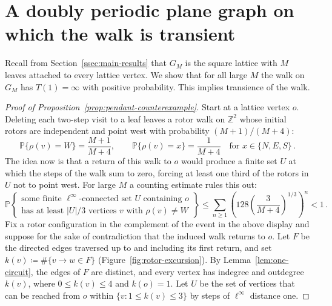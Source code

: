 \documentclass[11pt]{amsart}
\theoremstyle{plain}
\theoremstyle{definition}
\newcommand{\Z}{\mathbb Z}
\renewcommand{\P}{\mathbb P}
\begin{document}
	\section{A doubly periodic plane graph on which the walk is transient}
	\label{sec:counterexample}
	
	Recall from Section~\ref{ssec:main-results} that $G_M$ is the square
	lattice with $M$ leaves attached to every lattice vertex.  We show that for
	all large $M$ the walk on $G_M$ has $T(1)=\infty$ with positive probability.
	This implies transience of the walk.
	
	
	\begin{proof}[Proof of Proposition~\ref{prop:pendant-counterexample}]
		Start at a lattice vertex $o$.  Deleting each two-step visit to a leaf leaves
		a rotor walk on $\Z^2$ whose initial rotors are independent and point west
		with probability $(M+1)/(M+4)$:
		\[
		\P\{\rho(v)=W\}=\frac{M+1}{M+4},
		\qquad
		\P\{\rho(v)=x\}=\frac1{M+4}
		\quad\text{for }x \in\{N,E,S\}\, .
		\]
		The idea now is that a return of this walk to $o$ would produce a
		finite set $U$ at which the steps of the walk sum to
		zero, forcing at least one third of the rotors in $U$ not to point west.  For large $M$ a counting estimate rules this out:
		\[
		\P\left\{\begin{array}{c}
			\text{some finite $\ell^\infty$-connected set $U$ containing $o$}\\
			\text{has at least $|U|/3$ vertices $v$ with $\rho(v)\ne W$}
		\end{array}\right\}
		\leq\sum_{n\geq1}
		\left(128\left(\frac{3}{M+4}\right)^{1/3}\right)^n<1\, .
		\]
		Fix a rotor configuration in the complement of the event in the above display and suppose for the sake of contradiction that the induced walk returns to $o$.  Let $F$ be the directed edges traversed up to and including
		its first return, and set
		$k(v)\coloneqq\#\{v\to w\in F\}$
		(Figure~\ref{fig:rotor-excursion}).  By
		Lemma~\ref{lem:one-circuit}, the edges of $F$ are distinct, and every vertex
		has indegree and outdegree $k(v)$, where $0\leq k(v)\leq4$ and $k(o)=1$.
		Let $U$ be the set of vertices that can be reached from $o$ within
		$\{v:1\leq k(v)\leq3\}$ by steps of $\ell^\infty$ distance one.


\end{proof}
\end{document}
